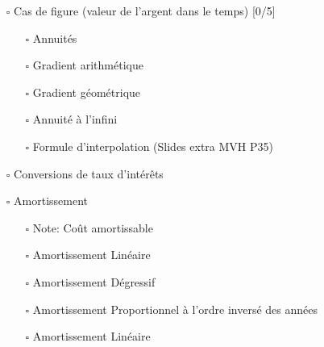 \documentclass[11pt]{article}
\begin{document}
\begin{itemize}
\begin{itemize}
\item[{$\square$}] 

\item[{$\square$}] 

\item[{$\square$}] 
\end{itemize}

\item[{$\square$}] Cas de figure (valeur de l'argent dans le temps) [0/5]
\begin{itemize}
\item[{$\square$}] Annuités
\item[{$\square$}] Gradient arithmétique
\item[{$\square$}] Gradient géométrique
\item[{$\square$}] Annuité à l'infini
\item[{$\square$}] Formule d'interpolation (Slides extra MVH P35)
\end{itemize}

\item[{$\square$}] Conversions de taux d'intérêts

\item[{$\square$}] Amortissement
\begin{itemize}
\item[{$\square$}] Note: Coût amortissable
\item[{$\square$}] Amortissement Linéaire
\item[{$\square$}] Amortissement Dégressif
\item[{$\square$}] Amortissement Proportionnel à l'ordre inversé des années
\item[{$\square$}] Amortissement Linéaire
\end{itemize}
\end{itemize}
\end{document}
